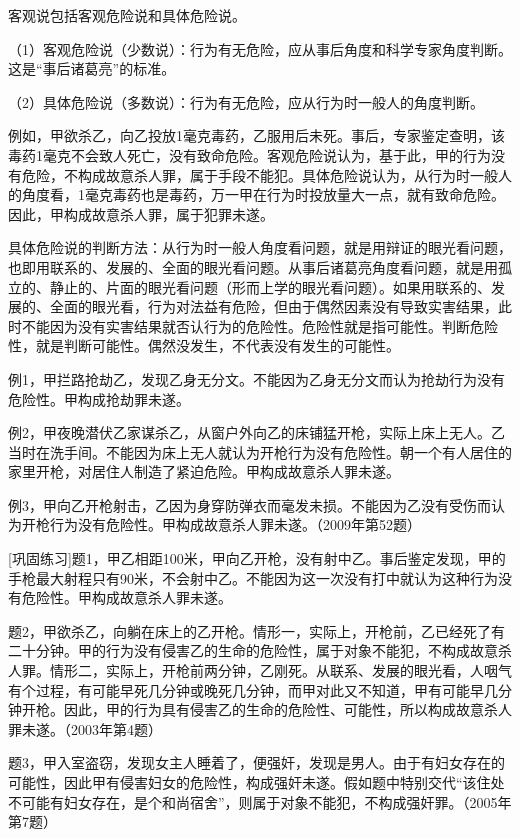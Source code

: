 客观说包括客观危险说和具体危险说。

（1）客观危险说（少数说）：行为有无危险，应从事后角度和科学专家角度判断。这是“事后诸葛亮”的标准。

（2）具体危险说（多数说）：行为有无危险，应从行为时一般人的角度判断。

例如，甲欲杀乙，向乙投放1毫克毒药，乙服用后未死。事后，专家鉴定查明，该毒药1毫克不会致人死亡，没有致命危险。客观危险说认为，基于此，甲的行为没有危险，不构成故意杀人罪，属于手段不能犯。具体危险说认为，从行为时一般人的角度看，1毫克毒药也是毒药，万一甲在行为时投放量大一点，就有致命危险。因此，甲构成故意杀人罪，属于犯罪未遂。

具体危险说的判断方法：从行为时一般人角度看问题，就是用辩证的眼光看问题，也即用联系的、发展的、全面的眼光看问题。从事后诸葛亮角度看问题，就是用孤立的、静止的、片面的眼光看问题（形而上学的眼光看问题）。如果用联系的、发展的、全面的眼光看，行为对法益有危险，但由于偶然因素没有导致实害结果，此时不能因为没有实害结果就否认行为的危险性。危险性就是指可能性。判断危险性，就是判断可能性。偶然没发生，不代表没有发生的可能性。

例1，甲拦路抢劫乙，发现乙身无分文。不能因为乙身无分文而认为抢劫行为没有危险性。甲构成抢劫罪未遂。

例2，甲夜晚潜伏乙家谋杀乙，从窗户外向乙的床铺猛开枪，实际上床上无人。乙当时在洗手间。不能因为床上无人就认为开枪行为没有危险性。朝一个有人居住的家里开枪，对居住人制造了紧迫危险。甲构成故意杀人罪未遂。

例3，甲向乙开枪射击，乙因为身穿防弹衣而毫发未损。不能因为乙没有受伤而认为开枪行为没有危险性。甲构成故意杀人罪未遂。（2009年第52题）

[巩固练习]题1，甲乙相距100米，甲向乙开枪，没有射中乙。事后鉴定发现，甲的手枪最大射程只有90米，不会射中乙。不能因为这一次没有打中就认为这种行为没有危险性。甲构成故意杀人罪未遂。

题2，甲欲杀乙，向躺在床上的乙开枪。情形一，实际上，开枪前，乙已经死了有二十分钟。甲的行为没有侵害乙的生命的危险性，属于对象不能犯，不构成故意杀人罪。情形二，实际上，开枪前两分钟，乙刚死。从联系、发展的眼光看，人咽气有个过程，有可能早死几分钟或晚死几分钟，而甲对此又不知道，甲有可能早几分钟开枪。因此，甲的行为具有侵害乙的生命的危险性、可能性，所以构成故意杀人罪未遂。（2003年第4题）

题3，甲入室盗窃，发现女主人睡着了，便强奸，发现是男人。由于有妇女存在的可能性，因此甲有侵害妇女的危险性，构成强奸未遂。假如题中特别交代“该住处不可能有妇女存在，是个和尚宿舍”，则属于对象不能犯，不构成强奸罪。（2005年第7题）

